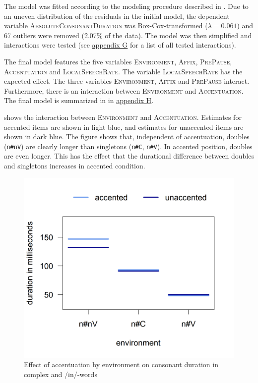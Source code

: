  The model was fitted according to the modeling procedure described in . Due to an uneven distribution of the residuals in the initial model, the dependent variable \textsc{AbsoluteConsonantDuration} was Box-Cox-transformed ($\lambda = 0.061$) and 67 outliers were removed (2.07\% of the data).
The model was then simplified and interactions were tested (see \hyperref[Appendix G Summaries of tested interactions in experimental study]{appendix G} for a list of all tested interactions).


The final model features the five variables \textsc{Environment}, \textsc{Affix}, \textsc{PrePause}, \textsc{Accentuation} and \textsc{LocalSpeechRate}. The variable \textsc{LocalSpeechRate} has the expected effect. The three variables \textsc{Environment}, \textsc{Affix} and \textsc{PrePause} interact. Furthermore, there is an interaction between \textsc{Environment} and \textsc{Accentuation}. The final model is summarized in  in \hyperref[Appendix H: Model Summaries Experiment]{appendix H}.


 shows the interaction between \textsc{Environment} and \textsc{Accentuation}. Estimates for accented items are shown in light blue, and estimates  for unaccented items are shown in dark blue. The figure shows that, independent of accentuation, doubles (\texttt{n\#nV}) are clearly longer than singletons (\texttt{n\#C}, \texttt{n\#V}). In accented position, doubles are even longer. This has the effect that the durational difference between doubles and singletons increases in accented condition.



\begin{figure} [h!]
	\centering
	\includegraphics [scale=0.5] {images/Experiment/UnInInterEnvAcc}
	\caption{Effect of accentuation by environment on consonant duration in complex  and /ɪn/-words}
	\label{fig: Un In experiment Env and accent}
\end{figure}

